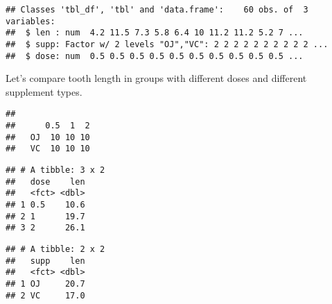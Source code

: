 \documentclass[]{article}
\newenvironment{Shaded}{\begin{snugshade}}{\end{snugshade}}
\newcommand{\KeywordTok}[1]{\textcolor[rgb]{0.13,0.29,0.53}{\textbf{#1}}}
\newcommand{\DataTypeTok}[1]{\textcolor[rgb]{0.13,0.29,0.53}{#1}}
\newcommand{\StringTok}[1]{\textcolor[rgb]{0.31,0.60,0.02}{#1}}
\newcommand{\OperatorTok}[1]{\textcolor[rgb]{0.81,0.36,0.00}{\textbf{#1}}}
\newcommand{\NormalTok}[1]{#1}
\begin{document}
\begin{verbatim}
## Classes 'tbl_df', 'tbl' and 'data.frame':    60 obs. of  3 variables:
##  $ len : num  4.2 11.5 7.3 5.8 6.4 10 11.2 11.2 5.2 7 ...
##  $ supp: Factor w/ 2 levels "OJ","VC": 2 2 2 2 2 2 2 2 2 2 ...
##  $ dose: num  0.5 0.5 0.5 0.5 0.5 0.5 0.5 0.5 0.5 0.5 ...
\end{verbatim}

Let's compare tooth length in groups with different doses and different
supplement types.

\begin{Shaded}
\end{Shaded}

\begin{verbatim}
##     
##      0.5  1  2
##   OJ  10 10 10
##   VC  10 10 10
\end{verbatim}

\begin{Shaded}
\end{Shaded}

\begin{verbatim}
## # A tibble: 3 x 2
##   dose    len
##   <fct> <dbl>
## 1 0.5    10.6
## 2 1      19.7
## 3 2      26.1
\end{verbatim}

\begin{Shaded}
\end{Shaded}

\begin{verbatim}
## # A tibble: 2 x 2
##   supp    len
##   <fct> <dbl>
## 1 OJ     20.7
## 2 VC     17.0
\end{verbatim}
\end{document}
